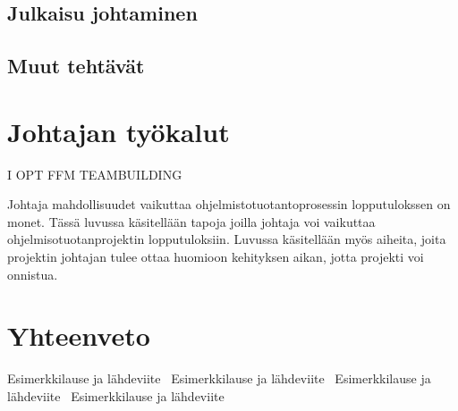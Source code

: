 \documentclass[finnish]{tktltiki2}
\theoremstyle{definition}
\theoremstyle{remark}
\begin{document}
\subsection{Julkaisu johtaminen}

\subsection{Muut tehtävät}

\section{Johtajan työkalut}

I OPT
FFM
TEAMBUILDING

Johtaja mahdollisuudet vaikuttaa ohjelmistotuotantoprosessin lopputulokssen on monet. Tässä luvussa käsitellään tapoja joilla johtaja voi vaikuttaa ohjelmisotuotanprojektin lopputuloksiin. Luvussa käsitellään myös aiheita, joita projektin johtajan tulee ottaa huomioon kehityksen aikan, jotta projekti voi onnistua. 




\section{Yhteenveto}







 





Esimerkkilause ja lähdeviite~\cite{Zhang:2011:ECL:2047594.2047666}
Esimerkkilause ja lähdeviite~\cite{Dhomne:2012:ITL:2382887.2382899}
Esimerkkilause ja lähdeviite~\cite{Augustine:2005:APM:1101779.1101781}
Esimerkkilause ja lähdeviite~\cite{Chow2008961}





%

%
% 
%



\end{document}
